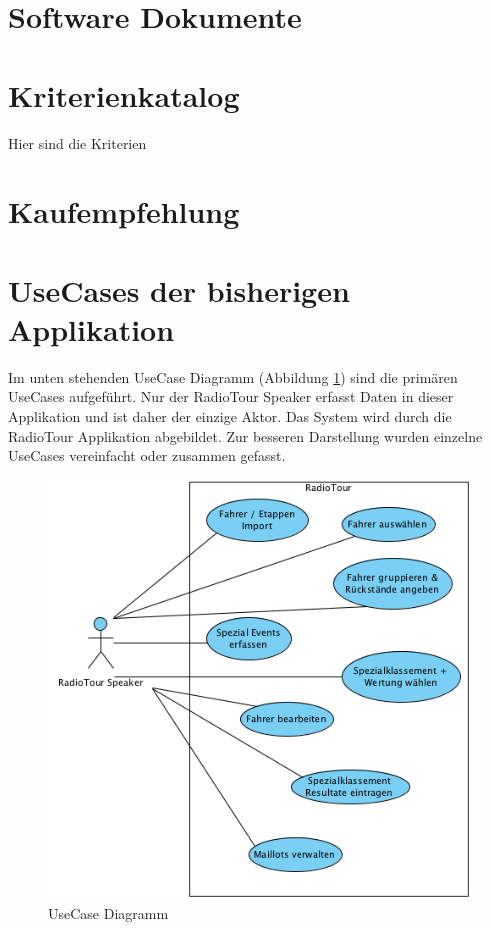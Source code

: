 \section{Software Dokumente}

\section{Kriterienkatalog}
\label{ref:kriterien}
Hier sind die Kriterien

\section{Kaufempfehlung}
\label{ref:kaufempfehlung}

\section{UseCases der bisherigen Applikation}
\label{ref:usecases}
Im unten stehenden UseCase Diagramm (Abbildung \ref{fig:usecasediagram}) sind die primären UseCases aufgeführt. Nur der RadioTour Speaker erfasst Daten in dieser Applikation und ist daher der einzige Aktor. Das System wird durch die RadioTour Applikation abgebildet. Zur besseren Darstellung wurden einzelne UseCases vereinfacht oder zusammen gefasst.
\begin{figure}[h1]
  \caption{UseCase Diagramm}
  \label{fig:usecasediagram}
  \begin{center}
    \includegraphics[scale=0.6]{05bericht/images/usecasediagram.png}
  \end{center}
\end{figure}

